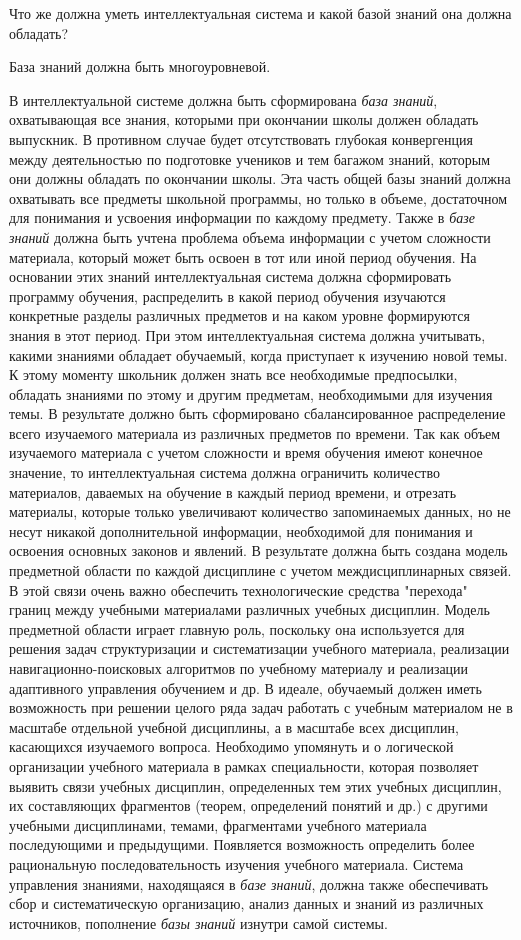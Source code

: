 Что же должна уметь интеллектуальная система и какой базой знаний она должна обладать?

База знаний должна быть многоуровневой.

В интеллектуальной системе должна быть сформирована \textit{база знаний}, охватывающая все знания, которыми при окончании школы должен обладать выпускник. В противном случае будет отсутствовать глубокая конвергенция между деятельностью по подготовке учеников и тем багажом знаний, которым они должны обладать по окончании школы. Эта часть общей базы знаний должна охватывать все предметы школьной программы, но только в объеме, достаточном для понимания и усвоения информации по каждому предмету. Также в \textit{базе знаний} должна быть учтена проблема объема информации с учетом сложности материала, который может быть освоен в тот или иной период обучения. На основании этих знаний интеллектуальная система должна сформировать программу обучения, распределить в какой период обучения изучаются конкретные разделы различных предметов и на каком уровне формируются знания в этот период. При этом интеллектуальная система должна учитывать, какими знаниями обладает обучаемый, когда приступает к изучению новой темы. К этому моменту школьник должен знать все необходимые предпосылки, обладать знаниями по этому и другим предметам, необходимыми для изучения темы. В результате должно быть сформировано сбалансированное распределение всего изучаемого материала из различных предметов по времени. Так как объем изучаемого материала с учетом сложности и время обучения имеют конечное значение, то интеллектуальная система должна ограничить количество материалов, даваемых на обучение в каждый период времени, и отрезать материалы, которые только увеличивают количество запоминаемых данных, но не несут никакой дополнительной информации, необходимой для понимания и освоения основных законов и явлений. В результате должна быть создана модель предметной области по каждой дисциплине с учетом междисциплинарных связей. В этой связи очень важно обеспечить технологические средства "перехода"{} границ между учебными материалами различных учебных дисциплин. Модель предметной области играет главную роль, поскольку она используется для решения задач структуризации и систематизации учебного материала, реализации навигационно-поисковых алгоритмов по учебному материалу и реализации адаптивного управления обучением и др. В идеале, обучаемый должен иметь возможность при решении целого ряда задач работать с учебным материалом не в масштабе отдельной учебной дисциплины, а в масштабе всех дисциплин, касающихся изучаемого вопроса. Необходимо упомянуть и о логической организации учебного материала в рамках специальности, которая позволяет выявить связи учебных дисциплин, определенных тем этих учебных дисциплин, их составляющих фрагментов (теорем, определений понятий и др.) с другими учебными дисциплинами, темами, фрагментами учебного материала последующими и предыдущими. Появляется возможность определить более рациональную последовательность изучения учебного материала. Система управления знаниями, находящаяся в \textit{базе знаний}, должна также обеспечивать сбор и систематическую организацию, анализ данных и знаний из различных источников, пополнение \textit{базы знаний} изнутри самой системы. 

